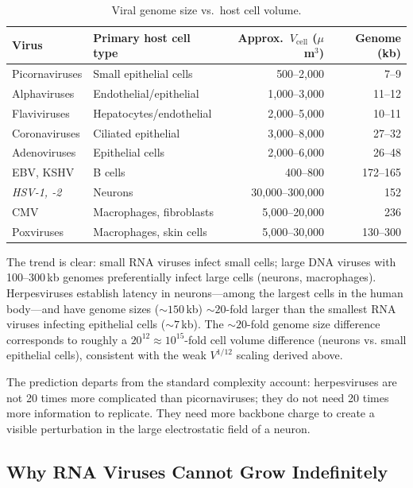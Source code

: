 \documentclass[12pt,a4paper]{article}
\theoremstyle{definition}
\theoremstyle{remark}
\begin{document}
\begin{table}[h]
\centering
\caption{Viral genome size vs.\ host cell volume.}
\label{tab:genome_scaling}
\begin{tabular}{p{3.2cm}lrr}
\toprule
Virus & Primary host cell type & Approx.\ $V_{\mathrm{cell}}$ ($\mu$m$^3$) & Genome (kb) \\
\midrule
Picornaviruses & Small epithelial cells & 500--2,000 & 7--9 \\
Alphaviruses & Endothelial/epithelial & 1,000--3,000 & 11--12 \\
Flaviviruses & Hepatocytes/endothelial & 2,000--5,000 & 10--11 \\
Coronaviruses & Ciliated epithelial & 3,000--8,000 & 27--32 \\
Adenoviruses & Epithelial cells & 2,000--6,000 & 26--48 \\
EBV, KSHV & B cells & 400--800 & 172--165 \\
\textit{HSV-1, -2} & Neurons & 30,000--300,000 & 152 \\
CMV & Macrophages, fibroblasts & 5,000--20,000 & 236 \\
Poxviruses & Macrophages, skin cells & 5,000--30,000 & 130--300 \\
\bottomrule
\end{tabular}
\end{table}

The trend is clear: small RNA viruses infect small cells; large DNA viruses with 100--300\,kb genomes preferentially infect large cells (neurons, macrophages). Herpesviruses establish latency in neurons---among the largest cells in the human body---and have genome sizes ($\sim\!150$\,kb) $\sim\!20$-fold larger than the smallest RNA viruses infecting epithelial cells ($\sim\!7$\,kb). The $\sim\!20$-fold genome size difference corresponds to roughly a $20^{12} \approx 10^{15}$-fold cell volume difference (neurons vs. small epithelial cells), consistent with the weak $V^{1/12}$ scaling derived above.

The prediction departs from the standard complexity account: herpesviruses are not 20 times more complicated than picornaviruses; they do not need 20 times more information to replicate. They need more backbone charge to create a visible perturbation in the large electrostatic field of a neuron.

\subsection{Why RNA Viruses Cannot Grow Indefinitely}
\end{document}
